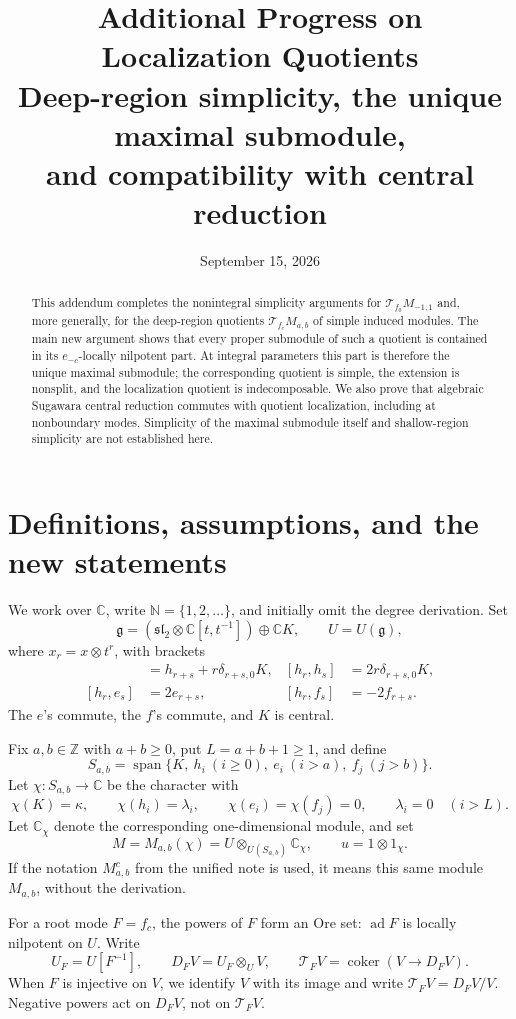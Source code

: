 \documentclass[11pt,a4paper]{article}
\title{Additional Progress on Localization Quotients\\[4pt]
  \large Deep-region simplicity, the unique maximal submodule,\\
  and compatibility with central reduction}
\author{}
\date{September 15, 2026}
\newcommand{\C}{\mathbb C}
\newcommand{\Z}{\mathbb Z}
\newcommand{\N}{\mathbb N}
\newcommand{\g}{\mathfrak g}
\newcommand{\slc}{\mathfrak{sl}_2}
\newcommand{\ad}{\operatorname{ad}}
\newcommand{\Span}{\operatorname{span}}
\newcommand{\T}{\mathcal T}
\theoremstyle{plainupright}
\begin{document}
\maketitle
\begin{abstract}
This addendum completes the nonintegral simplicity arguments for
\(\T_{f_0}M_{-1,1}\) and, more generally, for the deep-region quotients
\(\T_{f_c}M_{a,b}\) of simple induced modules.
The main new argument shows that every proper submodule of such a quotient
is contained in its \(e_{-c}\)-locally nilpotent part.
At integral parameters this part is therefore the unique maximal submodule;
the corresponding quotient is simple, the extension is nonsplit, and the
localization quotient is indecomposable.
We also prove that algebraic Sugawara central reduction commutes with
quotient localization, including at nonboundary modes.
Simplicity of the maximal submodule itself and shallow-region simplicity
are not established here.
\end{abstract}

\section{Definitions, assumptions, and the new statements}

We work over \(\C\), write \(\N=\{1,2,\ldots\}\), and initially omit
the degree derivation. Set
\[
\g=(\slc\otimes\C[t,t^{-1}])\oplus\C K,\qquad U=U(\g),
\]
where \(x_r=x\otimes t^r\), with brackets
\begin{align*}
[e_r,f_s]&=h_{r+s}+r\delta_{r+s,0}K,&
[h_r,h_s]&=2r\delta_{r+s,0}K,\\
[h_r,e_s]&=2e_{r+s},&
[h_r,f_s]&=-2f_{r+s}.
\end{align*}
The \(e\)'s commute, the \(f\)'s commute, and \(K\) is central.

Fix \(a,b\in\Z\) with \(a+b\ge0\), put \(L=a+b+1\ge1\), and define
\[
S_{a,b}=\Span\{K,\ h_i\ (i\ge0),\ e_i\ (i>a),\ f_j\ (j>b)\}.
\]
Let \(\chi:S_{a,b}\to\C\) be the character with
\[
\chi(K)=\kappa,\qquad \chi(h_i)=\lambda_i,\qquad
\chi(e_i)=\chi(f_j)=0,\qquad \lambda_i=0\quad(i>L).
\]
Let \(\C_\chi\) denote the corresponding one-dimensional module, and set
\[
M=M_{a,b}(\chi)=U\otimes_{U(S_{a,b})}\C_\chi,\qquad u=1\otimes1_\chi.
\]
If the notation \(M^c_{a,b}\) from the unified note \cite{Unified} is used,
it means this same module \(M_{a,b}\), without the derivation.

For a root mode \(F=f_c\), the powers of \(F\) form an Ore set:
\(\ad F\) is locally nilpotent on \(U\).
Write
\[
U_F=U[F^{-1}],\qquad D_FV=U_F\otimes_U V,\qquad
\T_FV=\operatorname{coker}(V\longrightarrow D_FV).
\]
When \(F\) is injective on \(V\), we identify \(V\) with its image and
write \(\T_FV=D_FV/V\). Negative powers act on \(D_FV\), not on
\(\T_FV\).
\end{document}
